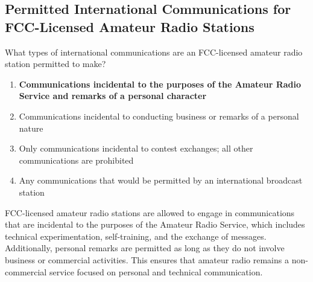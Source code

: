 \subsection{Permitted International Communications for FCC-Licensed Amateur Radio Stations}
\label{T1C03}

\begin{tcolorbox}[colback=gray!10!white,colframe=black!75!black,title=T1C03]
What types of international communications are an FCC-licensed amateur radio station permitted to make?
\begin{enumerate}[label=\Alph*),noitemsep]
    \item \textbf{Communications incidental to the purposes of the Amateur Radio Service and remarks of a personal character}
    \item Communications incidental to conducting business or remarks of a personal nature
    \item Only communications incidental to contest exchanges; all other communications are prohibited
    \item Any communications that would be permitted by an international broadcast station
\end{enumerate}
\end{tcolorbox}

FCC-licensed amateur radio stations are allowed to engage in communications that are incidental to the purposes of the Amateur Radio Service, which includes technical experimentation, self-training, and the exchange of messages. Additionally, personal remarks are permitted as long as they do not involve business or commercial activities. This ensures that amateur radio remains a non-commercial service focused on personal and technical communication.